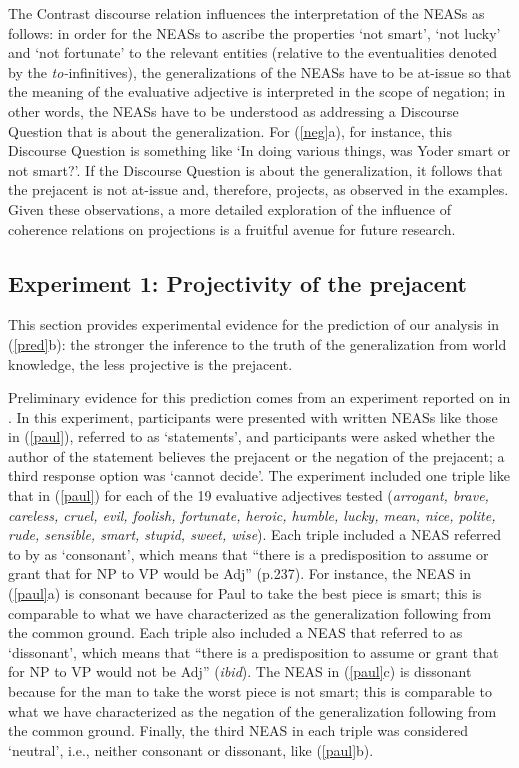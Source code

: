 \documentclass[11pt,fleqn]{article}
\newcommand{\6}{\mbox{$[\hspace*{-.6mm}[$}}
\newcommand{\9}{\mbox{$]\hspace*{-.6mm}]$}}
\begin{document}
The Contrast discourse relation influences the interpretation of the NEASs as follows: in order for the NEASs to ascribe the properties `not smart', `not lucky' and `not fortunate' to the relevant entities (relative to the eventualities denoted by the {\em to-}infinitives), the generalizations of the NEASs have to be at-issue so that the meaning of the evaluative adjective is interpreted in the scope of negation; in other words, the NEASs have to be understood as addressing a Discourse Question that is about the generalization. For (\ref{neg}a), for instance, this Discourse Question is something like `In doing various things, was Yoder smart or not smart?'. If the Discourse Question is about the generalization, it follows that the prejacent is not at-issue and, therefore, projects, as observed in the examples. Given these observations, a more detailed exploration of the influence of coherence relations on projections is a fruitful avenue for future research. 

\subsection{Experiment 1: Projectivity of the prejacent}\label{s42}

This section provides experimental evidence for the prediction of our analysis in (\ref{pred}b): the stronger the inference to the truth of the generalization from world knowledge, the less projective is the prejacent.

Preliminary evidence for this prediction comes from an experiment reported on in \citealt{karttunen-etal2014}. In this experiment, participants were presented with written NEASs like those in (\ref{paul}), referred to as `statements', and participants were asked whether the author of the statement believes  the prejacent or the negation of the prejacent; a third response option was `cannot decide'. The experiment included one triple like that in (\ref{paul}) for each of the 19 evaluative adjectives tested ({\em arrogant, brave, careless, cruel, evil,
foolish, fortunate, heroic, humble, lucky, mean, nice, polite, rude,
sensible, smart, stupid, sweet, wise}). Each triple included a NEAS referred to by \citet{karttunen-etal2014} as `consonant', which means that ``there is a predisposition to assume or grant that for NP to VP would be Adj'' (p.237). For instance, the NEAS in (\ref{paul}a) is consonant because for Paul to take the best piece is smart; this is comparable to what we have characterized as the generalization following from the common ground. Each triple also included a NEAS that \citet{karttunen-etal2014} referred to as `dissonant', which means that ``there is a predisposition to assume or grant that for NP to VP would not be Adj'' ({\em ibid}). The NEAS in (\ref{paul}c) is dissonant because for the man to take the worst piece is not smart; this is comparable to what we have characterized as the negation of the generalization following from the common ground. Finally, the third NEAS in each triple was considered `neutral', i.e., neither consonant or dissonant, like (\ref{paul}b).
\end{document}
